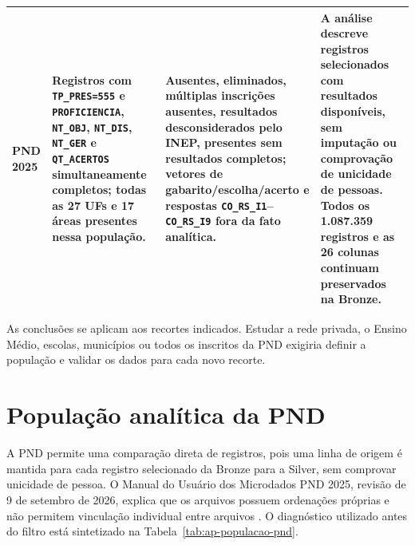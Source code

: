 \begin{landscape}
\begin{longtable}{|p{2.5cm}|p{6.0cm}|p{7.0cm}|p{5.8cm}|}
PND 2025 & Registros com \texttt{TP\_PRES=555} e \texttt{PROFICIENCIA}, \texttt{NT\_OBJ}, \texttt{NT\_DIS}, \texttt{NT\_GER} e \texttt{QT\_ACERTOS} simultaneamente completos; todas as 27 UFs e 17 áreas presentes nessa população. & Ausentes, eliminados, múltiplas inscrições ausentes, resultados desconsiderados pelo INEP, presentes sem resultados completos; vetores de gabarito/escolha/acerto e respostas \texttt{CO\_RS\_I1}--\texttt{CO\_RS\_I9} fora da fato analítica. & A análise descreve registros selecionados com resultados disponíveis, sem imputação ou comprovação de unicidade de pessoas. Todos os 1.087.359 registros e as 26 colunas continuam preservados na Bronze. \\ \hline
\end{longtable}
\end{landscape}

As conclusões se aplicam aos recortes indicados. Estudar a rede privada, o Ensino Médio, escolas, municípios ou todos os inscritos da PND exigiria definir a população e validar os dados para cada novo recorte.

\section{População analítica da PND}

A PND permite uma comparação direta de registros, pois uma linha de origem é mantida para cada registro selecionado da Bronze para a Silver, sem comprovar unicidade de pessoa. O Manual do Usuário dos Microdados PND 2025, revisão de 9 de setembro de 2026, explica que os arquivos possuem ordenações próprias e não permitem vinculação individual entre arquivos \cite[p.~6--7 do manual]{inep2025pnd}. O diagnóstico utilizado antes do filtro está sintetizado na Tabela~\ref{tab:ap-populacao-pnd}.

